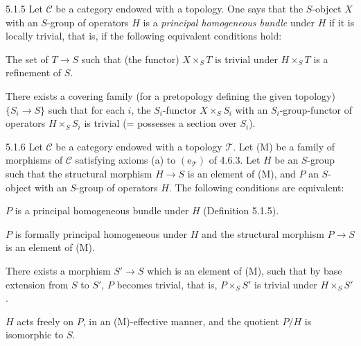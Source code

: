 \begin{definition}{5.1.5}\label{IV.5.1.5}
Let \(\mathcal C\) be a category endowed with a topology.
One says that the \(S\)-object \(X\) with an \(S\)-group
of operators \(H\) is a \emph{principal homogeneous bundle}
under \(H\) if it is locally trivial, that is, if the
following equivalent conditions hold:
\begin{enumeratei}
\item The set of \(T\to S\) such that (the functor)
\(X\times_S T\) is trivial under \(H\times_S T\) is
a refinement of \(S\).
\item There exists a covering family (for a pretopology
defining the given topology) \(\{S_i\to S\}\) such that
for each \(i\), the \(S_i\)-functor \(X\times_S S_i\)
with an \(S_i\)-group-functor of operators \(H\times_S S_i\)
is trivial (= possesses a section over \(S_i\)).
\end{enumeratei}
\end{definition}
\begin{proposition}{5.1.6}\label{IV.5.1.6}
Let \(\mathcal C\) be a category endowed with a topology
\(\mathcal T\). Let (M) be a family of morphisms of
\(\mathcal C\) satisfying axioms (a) to
\((\mathrm e_{\mathcal T})\) of 4.6.3.
Let \(H\) be an \(S\)-group such that the structural
morphism \(H\to S\) is an element of (M), and \(P\)
an \(S\)-object with an \(S\)-group of operators \(H\).
The following conditions are equivalent:
\begin{enumeratei}
\item \(P\) is a principal homogeneous bundle under
\(H\) (Definition 5.1.5).
\item \(P\) is formally principal homogeneous under
\(H\) and the structural morphism \(P\to S\) is
an element of (M).
\item There exists a morphism \(S'\to S\) which is an
element of (M), such that by base extension from \(S\)
to \(S'\), \(P\) becomes trivial, that is,
\(P\times_S S'\) is trivial under \(H\times_S S'\).
\item \(H\) acts freely on \(P\), in an (M)-effective
manner, and the quotient \(P/H\) is isomorphic to \(S\).
\end{enumeratei}
\end{proposition}
